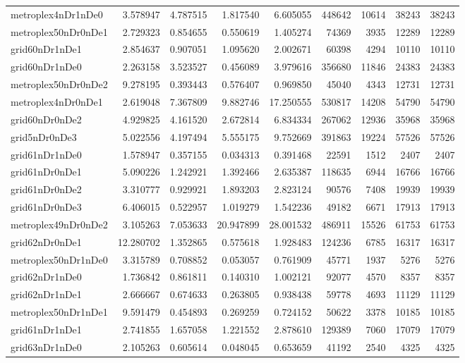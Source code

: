 \begin{longtable}{|l|r|r|r|r|r|r|r|r|}
metroplex4nDr1nDe0 & 3.578947 & 4.787515 & 1.817540 & 6.605055 & 448642 & 10614 & 38243 & 38243 \\
metroplex50nDr0nDe1 & 2.729323 & 0.854655 & 0.550619 & 1.405274 & 74369 & 3935 & 12289 & 12289 \\
grid60nDr1nDe1 & 2.854637 & 0.907051 & 1.095620 & 2.002671 & 60398 & 4294 & 10110 & 10110 \\
grid60nDr1nDe0 & 2.263158 & 3.523527 & 0.456089 & 3.979616 & 356680 & 11846 & 24383 & 24383 \\
metroplex50nDr0nDe2 & 9.278195 & 0.393443 & 0.576407 & 0.969850 & 45040 & 4343 & 12731 & 12731 \\
metroplex4nDr0nDe1 & 2.619048 & 7.367809 & 9.882746 & 17.250555 & 530817 & 14208 & 54790 & 54790 \\
grid60nDr0nDe2 & 4.929825 & 4.161520 & 2.672814 & 6.834334 & 267062 & 12936 & 35968 & 35968 \\
grid5nDr0nDe3 & 5.022556 & 4.197494 & 5.555175 & 9.752669 & 391863 & 19224 & 57526 & 57526 \\
grid61nDr1nDe0 & 1.578947 & 0.357155 & 0.034313 & 0.391468 & 22591 & 1512 & 2407 & 2407 \\
grid61nDr0nDe1 & 5.090226 & 1.242921 & 1.392466 & 2.635387 & 118635 & 6944 & 16766 & 16766 \\
grid61nDr0nDe2 & 3.310777 & 0.929921 & 1.893203 & 2.823124 & 90576 & 7408 & 19939 & 19939 \\
grid61nDr0nDe3 & 6.406015 & 0.522957 & 1.019279 & 1.542236 & 49182 & 6671 & 17913 & 17913 \\
metroplex49nDr0nDe2 & 3.105263 & 7.053633 & 20.947899 & 28.001532 & 486911 & 15526 & 61753 & 61753 \\
grid62nDr0nDe1 & 12.280702 & 1.352865 & 0.575618 & 1.928483 & 124236 & 6785 & 16317 & 16317 \\
metroplex50nDr1nDe0 & 3.315789 & 0.708852 & 0.053057 & 0.761909 & 45771 & 1937 & 5276 & 5276 \\
grid62nDr1nDe0 & 1.736842 & 0.861811 & 0.140310 & 1.002121 & 92077 & 4570 & 8357 & 8357 \\
grid62nDr1nDe1 & 2.666667 & 0.674633 & 0.263805 & 0.938438 & 59778 & 4693 & 11129 & 11129 \\
metroplex50nDr1nDe1 & 9.591479 & 0.454893 & 0.269259 & 0.724152 & 50622 & 3378 & 10185 & 10185 \\
grid61nDr1nDe1 & 2.741855 & 1.657058 & 1.221552 & 2.878610 & 129389 & 7060 & 17079 & 17079 \\
grid63nDr1nDe0 & 2.105263 & 0.605614 & 0.048045 & 0.653659 & 41192 & 2540 & 4325 & 4325 \\

\end{longtable}
